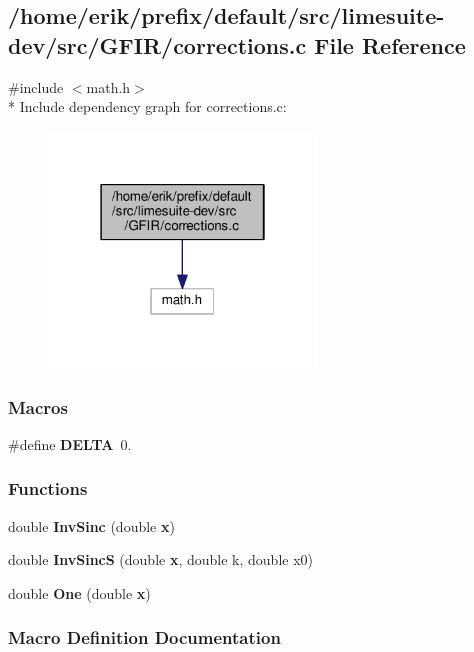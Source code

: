 \subsection{/home/erik/prefix/default/src/limesuite-\/dev/src/\+G\+F\+I\+R/corrections.c File Reference}
\label{corrections_8c}
{\ttfamily \#include $<$math.\+h$>$}\\*
Include dependency graph for corrections.\+c\+:
\nopagebreak
\begin{figure}[H]
\begin{center}
\leavevmode
\includegraphics[width=202pt]{d1/d11/corrections_8c__incl}
\end{center}
\end{figure}
\subsubsection*{Macros}
\begin{DoxyCompactItemize}
\item 
\#define {\bf D\+E\+L\+TA}~0.
\end{DoxyCompactItemize}
\subsubsection*{Functions}
\begin{DoxyCompactItemize}
\item 
double {\bf Inv\+Sinc} (double {\bf x})
\item 
double {\bf Inv\+SincS} (double {\bf x}, double k, double x0)
\item 
double {\bf One} (double {\bf x})
\end{DoxyCompactItemize}


\subsubsection{Macro Definition Documentation}
